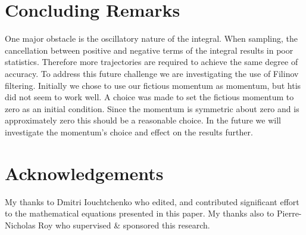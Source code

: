\documentclass[12pt,letterpaper,oneside,final,titlepage]{article}               %
\numberwithin{equation}{section} %
\begin{document}
\section{Concluding Remarks}
One major obstacle is the oscillatory nature of the integral. When sampling, the cancellation between positive and negative terms of the integral results in poor statistics. Therefore more trajectories are required to achieve the same degree of accuracy. To address this future challenge we are investigating the use of Filinov filtering.
Initially we chose to use our fictious momentum as momentum, but htis did not seem to work well.
A choice was made to set the fictious momentum to zero as an initial condition. 
Since the momentum is symmetric about zero and is approximately zero this should be a reasonable choice.
In the future we will investigate the momentum's choice and effect on the results further.

\section{Acknowledgements}
My thanks to Dmitri Iouchtchenko who edited, and contributed significant effort to the mathematical equations presented in this paper. 
My thanks also to Pierre-Nicholas Roy who supervised \& sponsored this research.

\renewcommand*{\bibfont}{\scriptsize}
\printbibliography
\end{document}

